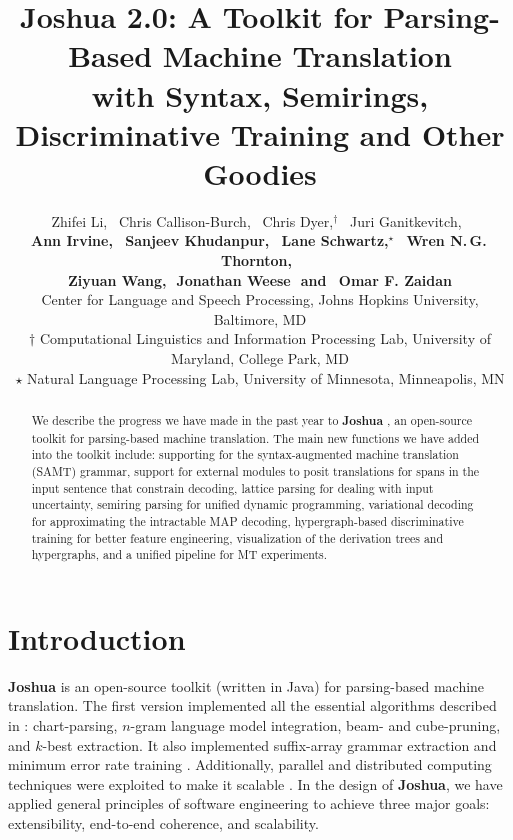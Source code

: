 \documentclass[11pt]{article}
\title{Joshua 2.0: A Toolkit for Parsing-Based Machine Translation \\with Syntax, Semirings, Discriminative Training and Other Goodies }
\author{
Zhifei Li,\,\,\,
Chris Callison-Burch,\,\,\,
Chris Dyer,$^\dagger$\,\,\,
Juri Ganitkevitch,\,\,\,
\\ {\bf
Ann Irvine,\,\,\,  
Sanjeev Khudanpur,\,\,\,
Lane Schwartz,$^\star$\,\,\, 
Wren N.\,G.\,Thornton,\,\,\,}
\\ {\bf
Ziyuan Wang,\,\,
Jonathan Weese\,\,
{\textnormal{and}}
\,\,\,Omar F. Zaidan
}\\
Center for Language and Speech Processing, Johns Hopkins University, Baltimore, MD\\
$\dagger$ Computational Linguistics and Information Processing Lab, University of Maryland, College Park, MD\\
$\star$ Natural Language Processing Lab, University of Minnesota, Minneapolis, MN }
\date{}
\newcommand{\joshua}{\textbf{Joshua}\xspace}
\begin{document}
\maketitle
\begin{abstract}
We describe the progress we have made in the past year to \textbf{Joshua} \cite{joshua-wmt09}, 
an open-source toolkit for parsing-based machine translation.
The main new functions we have added into the toolkit include: 
supporting for the syntax-augmented machine translation (SAMT) grammar,
support for external modules to posit translations for spans in the input sentence that constrain decoding,  
lattice parsing for dealing with input uncertainty,
semiring parsing for unified dynamic programming, 
variational decoding for approximating the intractable MAP decoding,
hypergraph-based discriminative training for better feature engineering, 
visualization of the derivation trees and hypergraphs, 
and a unified pipeline for MT experiments.
\end{abstract}


\listoftodos

\section{Introduction}

\textbf{Joshua} \cite{joshua-wmt09} is an open-source toolkit (written in Java) for parsing-based machine translation.
The first version implemented all the essential algorithms described 
in : chart-parsing, $n$-gram language model integration, beam- and cube-pruning, and $k$-best extraction.  
It also implemented suffix-array grammar extraction \cite{lopez:2007:EMNLP-CoNLL2007} 
and minimum error rate training \cite{och-mert}. 
Additionally, parallel and distributed computing techniques were exploited 
to make it scalable \cite{Joshua-old}. In the design of \joshua, we have applied general
principles of software engineering to achieve three
major goals: extensibility, end-to-end coherence,
and scalability.
\end{document}
